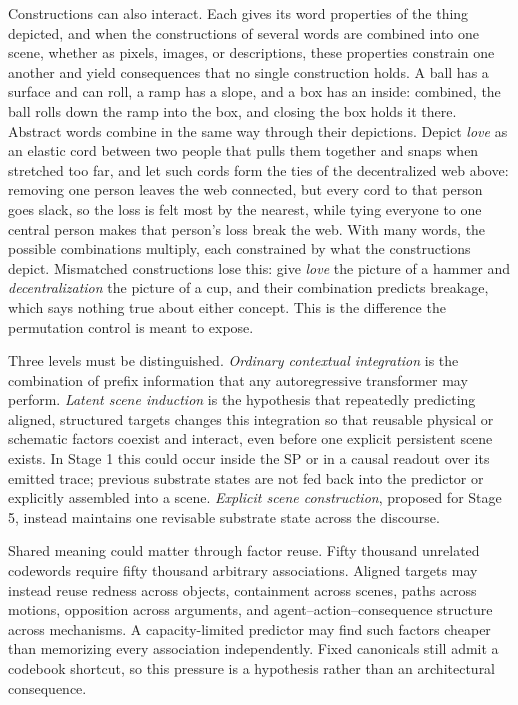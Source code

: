 \documentclass[11pt,a4paper]{article}
\begin{document}
Constructions can also interact. Each gives its word properties of the thing depicted, and when the constructions of several words are combined into one scene, whether as pixels, images, or descriptions, these properties constrain one another and yield consequences that no single construction holds. A ball has a surface and can roll, a ramp has a slope, and a box has an inside: combined, the ball rolls down the ramp into the box, and closing the box holds it there. Abstract words combine in the same way through their depictions. Depict \emph{love} as an elastic cord between two people that pulls them together and snaps when stretched too far, and let such cords form the ties of the decentralized web above: removing one person leaves the web connected, but every cord to that person goes slack, so the loss is felt most by the nearest, while tying everyone to one central person makes that person's loss break the web. With many words, the possible combinations multiply, each constrained by what the constructions depict. Mismatched constructions lose this: give \emph{love} the picture of a hammer and \emph{decentralization} the picture of a cup, and their combination predicts breakage, which says nothing true about either concept. This is the difference the permutation control is meant to expose.

Three levels must be distinguished. \emph{Ordinary contextual integration} is the combination of prefix information that any autoregressive transformer may perform. \emph{Latent scene induction} is the hypothesis that repeatedly predicting aligned, structured targets changes this integration so that reusable physical or schematic factors coexist and interact, even before one explicit persistent scene exists. In Stage 1 this could occur inside the SP or in a causal readout over its emitted trace; previous substrate states are not fed back into the predictor or explicitly assembled into a scene. \emph{Explicit scene construction}, proposed for Stage 5, instead maintains one revisable substrate state across the discourse.

Shared meaning could matter through factor reuse. Fifty thousand unrelated codewords require fifty thousand arbitrary associations. Aligned targets may instead reuse redness across objects, containment across scenes, paths across motions, opposition across arguments, and agent--action--consequence structure across mechanisms. A capacity-limited predictor may find such factors cheaper than memorizing every association independently. Fixed canonicals still admit a codebook shortcut, so this pressure is a hypothesis rather than an architectural consequence.
\end{document}
